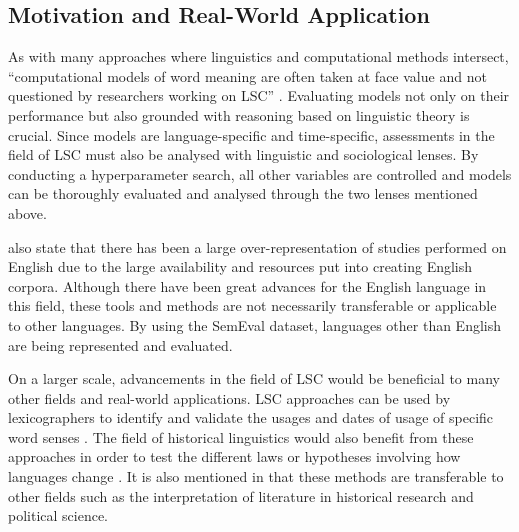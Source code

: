 
\subsection{Motivation and Real-World Application}

As with many approaches where linguistics and computational methods intersect, “computational models of word meaning are often taken at face value and not questioned by researchers working on LSC” \citep{hengchen2021challenges}. Evaluating models not only on their performance but also grounded with reasoning based on linguistic theory is crucial. Since models are language-specific and time-specific, assessments in the field of LSC must also be analysed with linguistic and sociological lenses. By conducting a hyperparameter search, all other variables are controlled and models can be thoroughly evaluated and analysed through the two lenses mentioned above. 

\citet{hengchen2021challenges} also state that there has been a large over-representation of studies performed on English due to the large availability and resources put into creating English corpora. Although there have been great advances for the English language in this field, these tools and methods are not necessarily transferable or applicable to other languages. By using the SemEval dataset, languages other than English are being represented and evaluated. 

On a larger scale, advancements in the field of LSC would be beneficial to many other fields and real-world applications. LSC approaches can be used by lexicographers to identify and validate the usages and dates of usage of specific word senses \citep{lau-etal-2012-word, falk-etal-2014-non, klosa-2018-newgerman}. The field of historical linguistics would also benefit from these approaches in order to test the different laws or hypotheses involving how languages change \citep{hamilton-etal-2016-diachronic, Xu2015ACE}. It is also mentioned in \citet{hengchen2021challenges} that these methods are transferable to other fields such as the interpretation of literature in historical research and political science.  


